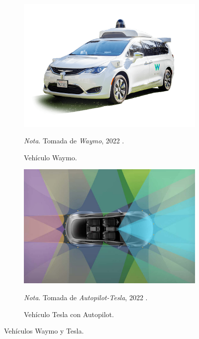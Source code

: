 \begin{figure}[h]
    \centering
    \begin{subfigure}{0.4\textwidth}
         \centering
         \includegraphics[width=\textwidth]{Figures/Figures_Cap02/waymo_car.png}
         \caption{Vehículo Waymo.}
         \textit{Nota}. Tomada de \textit{Waymo}, 2022 \cite{waymo}.
         \label{fig:waymo_cars}
    \end{subfigure}
    \hfill
    \begin{subfigure}{0.4\textwidth}
         \centering
         \includegraphics[width=\textwidth]{Figures/Figures_Cap02/tesla_car.jpg}
         \caption{Vehículo Tesla con Autopilot.}
         \textit{Nota}. Tomada de \textit{Autopilot-Tesla}, 2022 \cite{autopilot}.
         \label{fig:tesla_cars}
     \end{subfigure}
    \caption{Vehículos Waymo y Tesla.}
    \label{fig:waymo_tesla_cars}
\end{figure}

